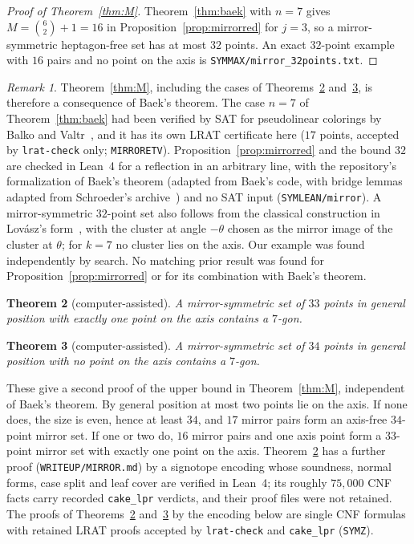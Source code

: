 \documentclass[11pt]{article}
\newtheorem{theorem}{Theorem}
\theoremstyle{remark}
\newtheorem{remark}[theorem]{Remark}
\begin{document}
\begin{proof}[Proof of Theorem~\ref{thm:M}]
Theorem~\ref{thm:baek} with $n=7$ gives $M=\binom{6}{2}+1=16$ in Proposition~\ref{prop:mirrorred} for $j=3$, so a
mirror-symmetric heptagon-free set has at most $32$ points. An exact $32$-point example with $16$ pairs and no point on
the axis is \texttt{SYMMAX/mirror\_32points.txt}.
\end{proof}

\begin{remark}\label{rem:mirrorcredit}
Theorem~\ref{thm:M}, including the cases of Theorems~\ref{thm:M33} and~\ref{thm:M34}, is therefore a consequence of
Baek's theorem. The case $n=7$ of Theorem~\ref{thm:baek} had been verified by SAT for pseudolinear colorings by Balko
and Valtr~\cite{BV15}, and it has its own LRAT certificate here ($17$ points, accepted by \texttt{lrat-check} only;
\texttt{MIRRORETV}). Proposition~\ref{prop:mirrorred} and the bound $32$ are checked in Lean~4 for a
reflection in an arbitrary line, with the repository's formalization of Baek's theorem (adapted from Baek's code, with
bridge lemmas adapted from Schroeder's archive~\cite{Sch26}) and no SAT input (\texttt{SYMLEAN/mirror}). A
mirror-symmetric $32$-point set also follows from the classical construction in Lov\'asz's form~\cite[Thm.~2.6]{MS00},
with the cluster at angle $-\theta$ chosen as the mirror image of the cluster at $\theta$; for $k=7$ no cluster lies on
the axis. Our example was found independently by search. No matching prior result was found for
Proposition~\ref{prop:mirrorred} or for its combination with Baek's theorem.
\end{remark}

\begin{theorem}[computer-assisted]\label{thm:M33}
A mirror-symmetric set of $33$ points in general position with exactly one point on the axis contains a $7$-gon.
\end{theorem}
\begin{theorem}[computer-assisted]\label{thm:M34}
A mirror-symmetric set of $34$ points in general position with no point on the axis contains a $7$-gon.
\end{theorem}
These give a second proof of the upper bound in Theorem~\ref{thm:M}, independent of Baek's theorem. By general position at
most two points lie on the axis. If none does, the size is even, hence at least $34$, and $17$ mirror pairs form an
axis-free $34$-point mirror set. If one or two do, $16$ mirror pairs and one axis point form a $33$-point mirror set with
exactly one point on the axis. Theorem~\ref{thm:M33} has a further proof (\texttt{WRITEUP/MIRROR.md}) by a signotope
encoding whose soundness, normal forms, case split and leaf cover are verified in Lean~4; its roughly $75{,}000$ CNF facts
carry recorded \texttt{cake\_lpr} verdicts, and their proof files were not retained. The proofs of
Theorems~\ref{thm:M33} and~\ref{thm:M34} by the encoding below are single CNF formulas with retained LRAT proofs accepted
by \texttt{lrat-check} and \texttt{cake\_lpr} (\texttt{SYMZ}).
\end{document}

